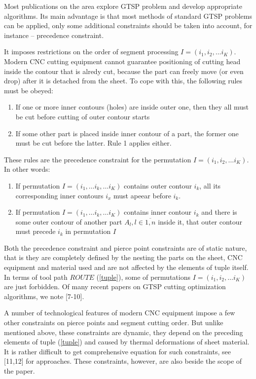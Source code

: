 \documentclass{../download/tPRS2e}
\begin{document}
Most publications on the area explore GTSP problem
and develop appropriate algorithms.
Its main advantage is that most methods
of standard GTSP problems can be applied,
only some additional constraints should be
taken into account,
for instance -- precedence constraint.

It imposes restrictions on the order of
segment processing
$I = (i_1, i_2, \dots i_K)$.
Modern CNC cutting equipment cannot guarantee
positioning of cutting head inside the contour
that is alredy cut,
because the part can freely move 
(or even drop)
after it is detached from the sheet.
To cope with this,
the following rules must be obeyed:

\begin{enumerate}
    \item{If one or more inner contours (holes) are inside outer one,
    then they all must be cut before cutting of outer contour starts
    }
    \item{If some other part is placed inside
    inner contour of a part,
    the former one must be cut before the latter.
    Rule 1 applies either.}
\end{enumerate}
These rules are the precedence constraint
for the permutation
$I = (i_1, i_2, \dots i_K)$.
In other words:
\begin{enumerate}
    \item{If permutation 
    $I = (i_1, \dots i_k, \dots i_K)$
    contains outer contour $i_k$,
    all its corresponding inner contours $i_x$
    must apeear before $i_k$.
    }
    \item{If permutation 
    $I = (i_1, \dots i_k, \dots i_K)$
    contains inner contour $i_k$
    and there is some outer contour
    of another part $A_l, l \in \overline{1,n}$
    inside it,
    that outer contour must precede $i_k$
    in permutation $I$}
\end{enumerate}

Both the precedence constraint
and pierce point constraints
are of static nature,
that is they are completely defined by
the nesting the parts on the sheet,
CNC equipment and material used
and are not affected by the elements
of tuple itself.
In terms of tool path $ROUTE$
(\ref{tuple}),
some of permutations
$I = (i_1, i_2, \dots i_K)$
are just forbidden.
Of many recent papers
on GTSP cutting optimization algorithms,
we note [7-10].

A number of technological features of modern CNC equipment
impose a few other constraints on
pierce points and segment cutting order.
But unlike mentioned above,
these constraints are dynamic,
they depend on the preceding elements
of tuple (\ref{tuple})
and caused by
thermal deformations of sheet material.
It is rather difficult to get comprehensive
equation for such constraints,
see [11,12] for approaches.
These constraints, however,
are also beside the scope of the paper.
\end{document}
